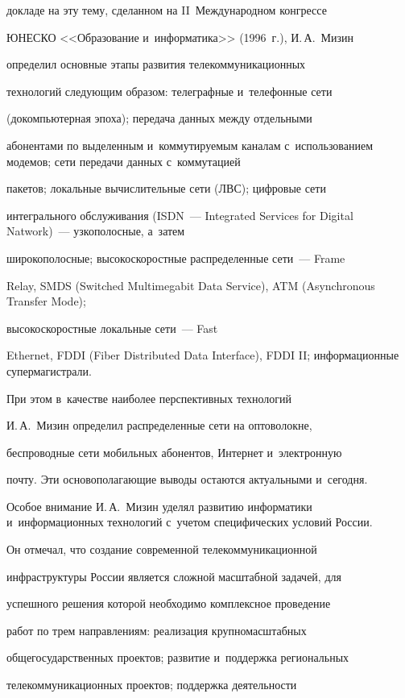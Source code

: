докладе на эту тему, сделанном на II~Международном конгрессе


ЮНЕСКО <<Образование и~информатика>>  (1996~г.), И.\,А.~Мизин


определил основные этапы развития телекоммуникационных


технологий следующим образом: телеграфные и~телефонные сети


(докомпьютерная эпоха); передача данных между отдельными


абонентами по выделенным и~коммутируемым каналам с~использованием модемов; сети передачи данных с~коммутацией


пакетов; локальные вычислительные сети (ЛВС); цифровые сети


интегрального обслуживания (ISDN~--- Integrated Services for Digital Natwork)~--- узкополосные, а~затем


широкополосные; высокоскоростные распределенные сети~--- Frame


Relay, SMDS (Switched Multimegabit Data Service), ATM (Asynchronous Transfer Mode);


высокоскоростные локальные сети~--- Fast


Ethernet, FDDI (Fiber Distributed Data Interface), FDDI II; информационные супермагистрали.


%


     При этом в~качестве наиболее перспективных технологий


И.\,А.~Мизин определил распределенные сети на оптоволокне,


беспроводные сети мобильных абонентов, Интернет и~электронную


почту. Эти основополагающие выводы остаются актуальными и~сегодня.





     Особое внимание И.\,А.~Мизин уделял развитию информатики и~информационных технологий с~учетом специфических условий России.


Он отмечал, что создание современной телекоммуникационной


инфраструктуры России является сложной масштабной задачей, для


успешного решения которой необходимо комплексное проведение


работ по трем направлениям: реализация крупномасштабных


общегосударственных проектов; развитие и~поддержка региональных


телекоммуникационных проектов; поддержка деятельности


